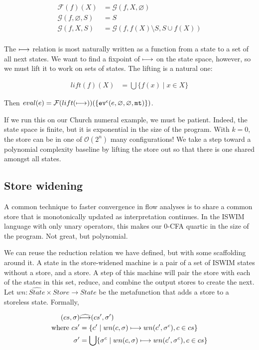 \documentclass[preprint,onecolumn,9pt]{sigplanconf} %
\begin{document}
\begin{align*}
{\mathcal F}(f)(X) &= {\mathcal G}(f, X, \varnothing) \\
{\mathcal G}(f, \varnothing, S) &= S \\
{\mathcal G}(f, X, S) &= {\mathcal G}(f, f(X) \setminus S, S \cup f(X)) \\
\end{align*}

The $\machstep$ relation is most naturally written as a function from
a state to a set of all next states. We want to find a fixpoint of
$\machstep$ on the state space, however, so we must lift it to work on
sets of states. The lifting is a natural one:

\begin{align*}
lift(f)(X) &= \bigcup\{f(x) \mid x \in X\}
\end{align*}

Then $eval(e) = {\mathcal F}(lift(\machstep))(\{\ev[^\mtcntr]{e, \varnothing, \varnothing, \kmt}\})$.

If we run this on our Church numeral example, we must be
patient. Indeed, the state space is finite, but it is exponential in
the size of the program. With $k = 0$, the store can be in one of ${\mathcal
  O}(2^n)$ many configurations! We take a step toward a polynomial
complexity baseline by lifting the store out so that there is one
shared amongst all states.

\subsection{Store widening}

A common technique to faster convergence in flow analyses is to share
a common store that is monotonically updated as interpretation
continues. In the ISWIM language with only unary operators, this makes
our 0-CFA quartic in the size of the program. Not great, but
polynomial.

We can reuse the reduction relation we have defined, but with some
scaffolding around it. A state in the store-widened machine is a pair
of a set of ISWIM states without a store, and a store. A step of this
machine will pair the store with each of the states in this set,
reduce, and combine the output stores to create the next. Let $wn :
\widehat{State} \times Store \to State$ be the metafunction that adds
a store to a storeless state. Formally,

\begin{align*}
(cs, \msto) &\widehat{\machstep} (cs', \msto') \\
\mbox{where } cs' &= \{c' \mid wn(c, \msto) \machstep wn(c', \msto^c), c \in cs\} \\
             \msto' &= \bigcup\{\msto^c \mid wn(c, \msto) \machstep wn(c', \msto^c), c \in cs\}
\end{align*}
\end{document}
